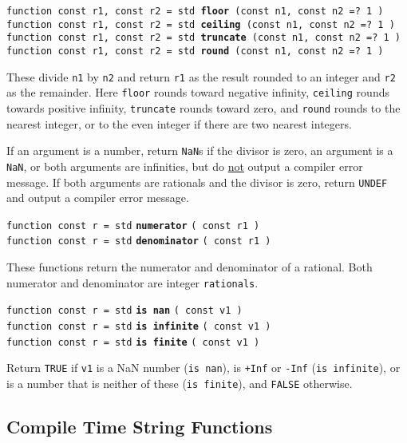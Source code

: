 \documentclass[12pt]{article}
\newcommand{\ttkey}[1]{{\tt \bfseries #1}}
\newenvironment{indpar}[1][0.3in]%
	{\begin{list}{}%
		     {\setlength{\itemsep}{0in}%
		      \setlength{\topsep}{0in}%
		      \setlength{\parsep}{1ex}%
		      \setlength{\labelwidth}{#1}%
		      \setlength{\leftmargin}{#1}%
		      \addtolength{\leftmargin}{\labelsep}}%
	 \item}%
	{\end{list}}
\begin{document}
{\tt function const r1, const r2 =
    std \ttkey{floor} (const n1, const n2 =? 1 )} \\
{\tt function const r1, const r2 =
    std \ttkey{ceiling} (const n1, const n2 =? 1 )} \\
{\tt function const r1, const r2 =
    std \ttkey{truncate} (const n1, const n2 =? 1 )} \\
{\tt function const r1, const r2 =
    std \ttkey{round} (const n1, const n2 =? 1 )}
\begin{indpar}
These divide {\tt n1} by {\tt n2} and return {\tt r1} as the
result rounded to an integer and {\tt r2} as the remainder.
Here {\tt floor} rounds toward negative infinity, {\tt ceiling}
rounds towards positive infinity, {\tt truncate} rounds toward
zero, and {\tt round} rounds to the nearest integer, or to the
even integer if there are two nearest integers.

If an argument is a number, return {\tt NaN}s if the divisor is
zero, an argument is a {\tt NaN}, or both arguments are infinities, but
do \underline{not} output a compiler error message.  If both
arguments are rationals and the divisor is zero, return
{\tt UNDEF} and output a compiler error message.
\end{indpar}

{\tt function const r = std} \ttkey{numerator} {\tt ( const r1 )} \\
{\tt function const r = std} \ttkey{denominator} {\tt ( const r1 )}
\begin{indpar}
These functions return the numerator and denominator of a rational.
Both numerator and denominator are integer {\tt rationals}.
\end{indpar}

{\tt function const r = std} \ttkey{is nan} {\tt ( const v1 )} \\
{\tt function const r = std} \ttkey{is infinite} {\tt ( const v1 )} \\
{\tt function const r = std} \ttkey{is finite} {\tt ( const v1 )}
\begin{indpar}
Return {\tt TRUE} if {\tt v1} is a NaN number ({\tt is nan}),
is {\tt +Inf} or {\tt -Inf} ({\tt is infinite}), or
is a number that is neither of these ({\tt is finite}), and {\tt FALSE}
otherwise.
\end{indpar}

\subsection{Compile Time String Functions}
\end{document}
